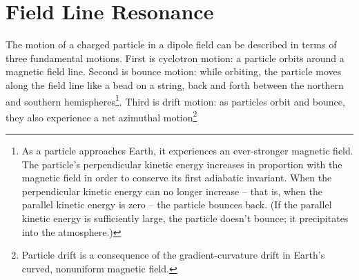 \section{Field Line Resonance}









The motion of a charged particle in a dipole field can be described in terms of three fundamental motions. First is cyclotron motion: a particle orbits around a magnetic field line. Second is bounce motion: while orbiting, the particle moves along the field line like a bead on a string, back and forth between the northern and southern hemispheres\footnote{As a particle approaches Earth, it experiences an ever-stronger magnetic field. The particle's perpendicular kinetic energy increases in proportion with the magnetic field in order to conserve its first adiabatic invariant. When the perpendicular kinetic energy can no longer increase -- that is, when the parallel kinetic energy is zero -- the particle bounces back. (If the parallel kinetic energy is sufficiently large, the particle doesn't bounce; it precipitates into the atmosphere.)}. Third is drift motion: as particles orbit and bounce, they also experience a net azimuthal motion\footnote{Particle drift is a consequence of the gradient-curvature drift in Earth's curved, nonuniform magnetic field.}




